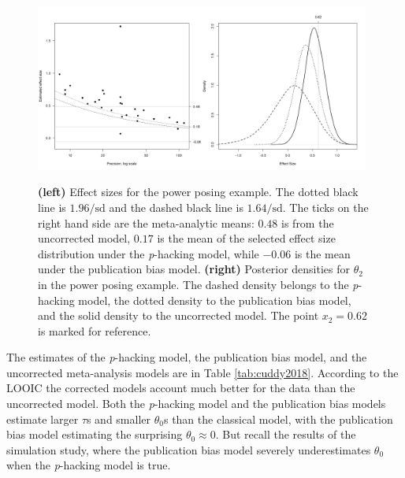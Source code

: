 \documentclass[useAMS,usenatbib,referee]{biom}
\begin{document}
\begin{figure}
\noindent \begin{centering}
\includegraphics[width=0.49\textwidth]{plots/cuddy2018}\includegraphics[width=0.49\textwidth]{plots/cuddy2018_posterior}
\par\end{centering}
\caption{\label{fig:cuddy2017} \textbf{(left)} Effect sizes for the power posing example. The dotted black line is $1.96/\textrm{sd}$ and the dashed black line is $1.64/\textrm{sd}$. The ticks on the right hand side are
the meta-analytic means: $0.48$ is from the uncorrected model, $0.17$ is the mean of the selected effect size distribution under the \textit{p}-hacking model, while $-0.06$ is the mean under the publication bias model. \textbf{(right)} Posterior densities for $\theta_{2}$ in the power posing example. The dashed density belongs to the \textit{p}-hacking model, the dotted density to the publication bias model, and the solid density to the uncorrected model. The point $x_{2}=0.62$ is marked for reference.}
\end{figure}

The estimates of the \textit{p}-hacking model, the publication bias model, and the uncorrected meta-analysis models are in Table \ref{tab:cuddy2018}. According to the LOOIC the corrected models account much better for the data than the uncorrected model. Both the \textit{p}-hacking model and the publication bias models estimate
larger $\tau$s and smaller $\theta_{0}$s than the classical model, with the publication bias model estimating the surprising $\theta_{0}\approx0$. But recall the results of the simulation study, where the publication bias model severely underestimates $\theta_0$ when the \textit{p}-hacking model is true.
\end{document}
